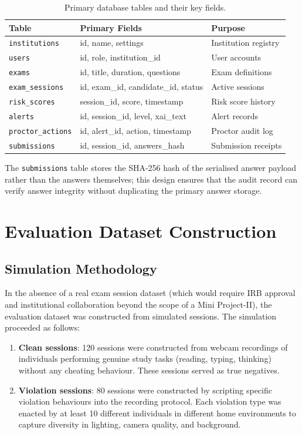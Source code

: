 \begin{table}[h]
    \centering
    \caption{Primary database tables and their key fields.}
    \begin{tabular}{@{}lll@{}}
        \toprule
        Table & Primary Fields & Purpose \\
        \midrule
        \texttt{institutions}  & id, name, settings & Institution registry \\
        \texttt{users}         & id, role, institution\_id & User accounts \\
        \texttt{exams}         & id, title, duration, questions & Exam definitions \\
        \texttt{exam\_sessions} & id, exam\_id, candidate\_id, status & Active sessions \\
        \texttt{risk\_scores}  & session\_id, score, timestamp & Risk score history \\
        \texttt{alerts}        & id, session\_id, level, xai\_text & Alert records \\
        \texttt{proctor\_actions} & id, alert\_id, action, timestamp & Proctor audit log \\
        \texttt{submissions}   & id, session\_id, answers\_hash & Submission receipts \\
        \bottomrule
    \end{tabular}
    \label{tab:schema}
\end{table}

The \texttt{submissions} table stores the SHA-256 hash of the serialised answer payload rather than the answers themselves; this design ensures that the audit record can verify answer integrity without duplicating the primary answer storage.

\section{Evaluation Dataset Construction}

\subsection{Simulation Methodology}

In the absence of a real exam session dataset (which would require IRB approval and institutional collaboration beyond the scope of a Mini Project-II), the evaluation dataset was constructed from simulated sessions. The simulation proceeded as follows:

\begin{enumerate}
    \item \textbf{Clean sessions}: 120 sessions were constructed from webcam recordings of individuals performing genuine study tasks (reading, typing, thinking) without any cheating behaviour. These sessions served as true negatives.
    \item \textbf{Violation sessions}: 80 sessions were constructed by scripting specific violation behaviours into the recording protocol. Each violation type was enacted by at least 10 different individuals in different home environments to capture diversity in lighting, camera quality, and background.
\end{enumerate}


